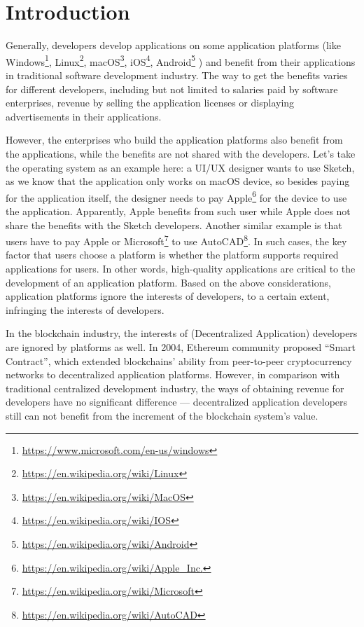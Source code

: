 \section{Introduction}
\noindent
Generally, developers develop applications on some application platforms (like
Windows\footnote{\url{https://www.microsoft.com/en-us/windows}}, Linux\footnote{\url{https://en.wikipedia.org/wiki/Linux}},
macOS\footnote{\url{https://en.wikipedia.org/wiki/MacOS}},
iOS\footnote{\url{https://en.wikipedia.org/wiki/IOS}},
Android\footnote{\url{https://en.wikipedia.org/wiki/Android}} \etc) and
benefit from their applications in traditional software development industry.
The way to get the benefits varies for different developers, including but not
limited to salaries paid by software enterprises, revenue by selling the
application licenses or displaying advertisements in their applications.

However, the enterprises who build the application platforms also benefit
from the applications, while the benefits are not shared with the developers.
Let's take the operating system as an example here: a UI/UX designer wants to use Sketch,
as we know that the application only works on {macOS} device, so besides
paying for the application itself, the designer needs to pay Apple\footnote{\url{https://en.wikipedia.org/wiki/Apple_Inc.}}
for the device  to use the application. Apparently, Apple benefits from such user while
Apple does not share the benefits with the Sketch developers.
Another similar example is that users have to pay Apple or
Microsoft\footnote{\url{https://en.wikipedia.org/wiki/Microsoft}} to use
AutoCAD\footnote{\url{https://en.wikipedia.org/wiki/AutoCAD}}. In such cases,
the key factor that users choose a platform is whether the platform
supports required applications for users. In other words, high-quality
applications are critical to the development of an application platform. Based on the above considerations,  application platforms ignore the interests of developers, to a certain extent, infringing the interests of developers.

In the blockchain industry, the interests of \dapp(Decentralized Application) developers are ignored by platforms  as  well.
 In 2004, Ethereum community proposed ``Smart Contract'',
which extended blockchains' ability from peer-to-peer
cryptocurrency networks to decentralized application platforms. However, in comparison with traditional centralized development industry, the ways of obtaining revenue for developers have no significant difference --- decentralized application developers still can not benefit
 from the increment of the blockchain system's value.


